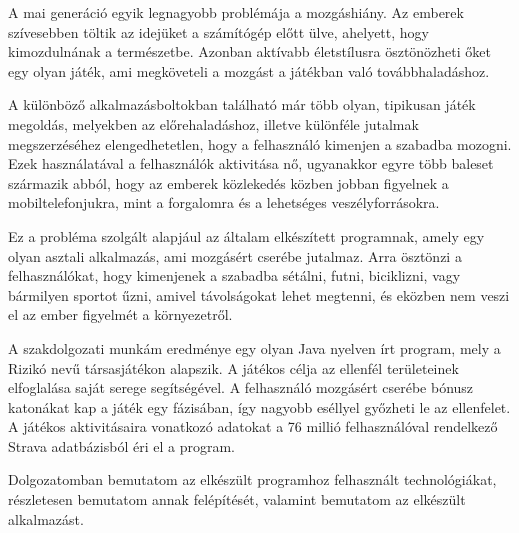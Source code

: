 A mai generáció egyik legnagyobb problémája a mozgáshiány. Az emberek szívesebben töltik az idejüket a számítógép előtt ülve, ahelyett, hogy kimozdulnának a természetbe. Azonban aktívabb életstílusra ösztönözheti őket egy olyan játék, ami megköveteli a mozgást a játékban való továbbhaladáshoz. 

A különböző alkalmazásboltokban található már több olyan, tipikusan játék megoldás, melyekben az előrehaladáshoz, illetve különféle jutalmak megszerzéséhez elengedhetetlen, hogy a felhasználó kimenjen a szabadba mozogni. Ezek használatával a felhasználók aktivitása nő, ugyanakkor egyre több baleset származik abból, hogy az emberek közlekedés közben jobban figyelnek a mobiltelefonjukra, mint a forgalomra és a lehetséges veszélyforrásokra. 

Ez a probléma szolgált alapjául az általam elkészített programnak, amely egy olyan asztali alkalmazás, ami mozgásért cserébe jutalmaz. Arra ösztönzi a felhasználókat, hogy kimenjenek a szabadba sétálni, futni, biciklizni, vagy bármilyen sportot űzni, amivel távolságokat lehet megtenni, és eközben nem veszi el az ember figyelmét a környezetről. 

A szakdolgozati munkám eredménye egy olyan Java nyelven írt program, mely a Rizikó nevű társasjátékon alapszik. A játékos célja az ellenfél területeinek elfoglalása saját serege segítségével. A felhasználó mozgásért cserébe bónusz katonákat kap a játék egy fázisában, így nagyobb eséllyel győzheti le az ellenfelet. A játékos aktivitásaira vonatkozó adatokat a 76 millió felhasználóval rendelkező Strava adatbázisból éri el a program. 

Dolgozatomban bemutatom az elkészült programhoz felhasznált technológiákat, részletesen bemutatom annak felépítését, valamint bemutatom az elkészült alkalmazást. 